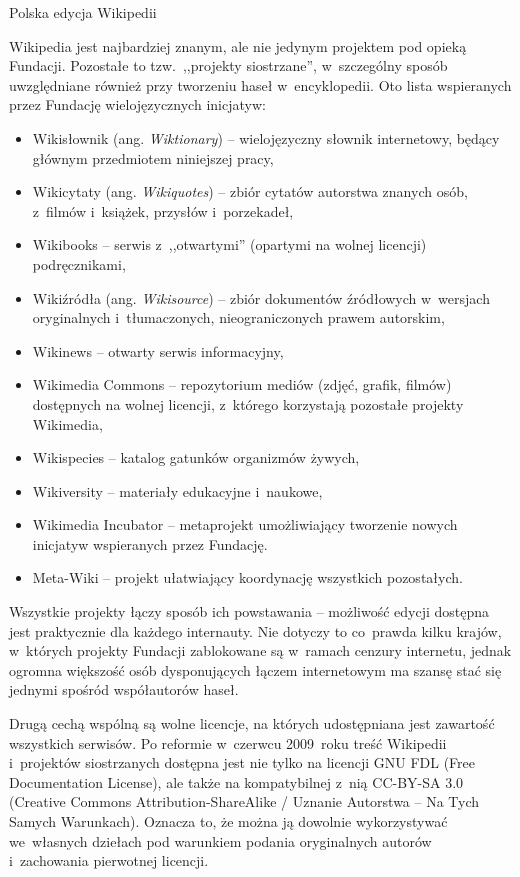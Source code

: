 \documentclass{pracamgr}
\begin{document}
\begin{illustration}
	\caption{Polska edycja Wikipedii}
\end{illustration}

Wikipedia jest najbardziej znanym, ale nie jedynym projektem pod opieką Fundacji. Pozostałe to tzw.\ ,,projekty siostrzane'', w~szczególny sposób uwzględniane również przy tworzeniu haseł w~encyklopedii. Oto lista wspieranych przez Fundację wielojęzycznych inicjatyw:
\begin{itemize}
	\item Wikisłownik (ang. \emph{Wiktionary}) -- wielojęzyczny słownik internetowy, będący głównym przedmiotem niniejszej pracy,
	\item Wikicytaty (ang. \emph{Wikiquotes}) -- zbiór cytatów autorstwa znanych osób, z~filmów i~książek, przysłów i~porzekadeł,
	\item Wikibooks -- serwis z~,,otwartymi'' (opartymi na wolnej licencji) podręcznikami,
	\item Wikiźródła (ang. \emph{Wikisource}) -- zbiór dokumentów źródłowych w~wersjach oryginalnych i~tłumaczonych, nieograniczonych prawem autorskim,
	\item Wikinews -- otwarty serwis informacyjny,
	\item Wikimedia Commons -- repozytorium mediów (zdjęć, grafik, filmów) dostępnych na wolnej licencji, z~którego korzystają pozostałe projekty Wikimedia,
	\item Wikispecies -- katalog gatunków organizmów żywych,
	\item Wikiversity -- materiały edukacyjne i~naukowe,
	\item Wikimedia Incubator -- metaprojekt umożliwiający tworzenie nowych inicjatyw wspieranych przez Fundację.
	\item Meta-Wiki -- projekt ułatwiający koordynację wszystkich pozostałych.
\end{itemize}
Wszystkie projekty łączy sposób ich powstawania -- możliwość edycji dostępna jest praktycznie dla każdego internauty. Nie dotyczy to co~prawda kilku krajów, w~których projekty Fundacji zablokowane są w~ramach cenzury internetu, jednak ogromna większość osób dysponujących łączem internetowym ma szansę stać się jednymi spośród współautorów haseł.

Drugą cechą wspólną są wolne licencje, na których udostępniana jest zawartość wszystkich serwisów. Po reformie w~czerwcu 2009~roku treść Wikipedii i~projektów siostrzanych dostępna jest nie tylko na licencji GNU FDL (Free Documentation License), ale także na kompatybilnej z~nią CC-BY-SA 3.0 (Creative Commons Attribution-ShareAlike / Uznanie Autorstwa -- Na Tych Samych Warunkach). %
Oznacza to, że można ją dowolnie wykorzystywać we~własnych dziełach pod warunkiem podania oryginalnych autorów i~zachowania pierwotnej licencji.
\end{document}
